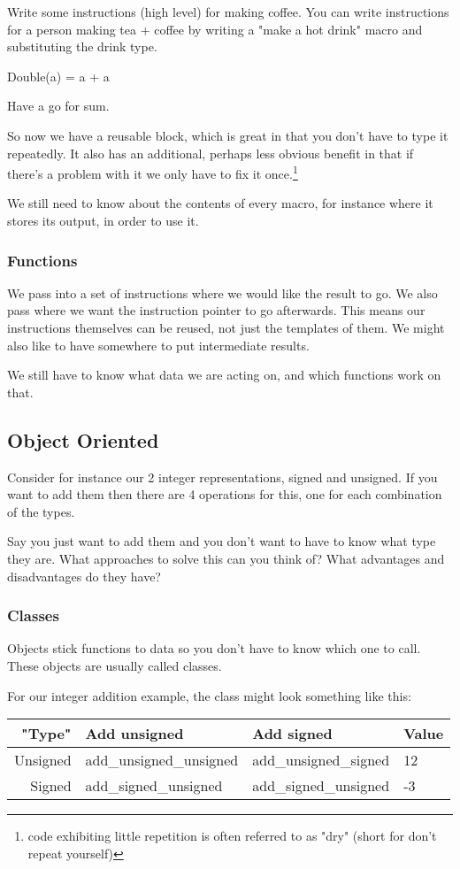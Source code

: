\documentclass{article}
\begin{document}
Write some instructions (high level) for making coffee.
You can write instructions for a person making tea + coffee by writing a "make
a hot drink" macro and substituting the drink type.

Double(a) = a + a

Have a go for sum.

So now we have a reusable block, which is great in that you don't have to type
it repeatedly.  It also has an additional, perhaps less obvious benefit in that
if there's a problem with it we only have to fix it once.\footnote{
code exhibiting little repetition is often referred to as "dry" (short for
don't repeat yourself)}

We still need to know about the contents of every macro, for instance where it
stores its output, in order to use it.
\subsubsection{Functions}
We pass into a set of instructions where we would like the result to go.
We also pass where we want the instruction pointer to go afterwards.
This means our instructions themselves can be reused, not just the templates of them.
We might also like to have somewhere to put intermediate results.

We still have to know what data we are acting on, and which functions work on that.
\subsection{Object Oriented}
Consider for instance our 2 integer representations, signed and unsigned.
If you want to add them then there are 4 operations for this, one for each
combination of the types.

Say you just want to add them and you don't want to have to know what type they are.
What approaches to solve this can you think of?
What advantages and disadvantages do they have?

\subsubsection{Classes}
Objects stick functions to data so you don't have to know which one to call.
These objects are usually called classes.

For our integer addition example, the class might look something like this:
\begin{tabular}{| r || l | l | l |}
\hline
"Type" & Add unsigned & Add signed & Value \\
\hline
Unsigned & add\_unsigned\_unsigned & add\_unsigned\_signed & 12 \\
Signed & add\_signed\_unsigned & add\_signed\_unsigned & -3 \\
\hline
\end{tabular}
\end{document}
